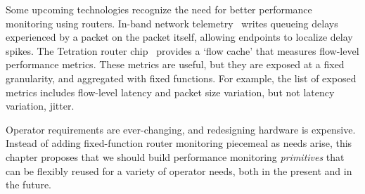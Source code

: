 Some upcoming technologies recognize the need for better performance monitoring
using routers. In-band network telemetry~\cite{int} writes queueing delays
experienced by a packet on the packet itself, allowing endpoints to localize
delay spikes. The Tetration router chip~\cite{tetration-telemetry} provides a
`flow cache' that measures flow-level performance metrics.
%
These metrics are useful, but they are exposed at a fixed granularity, and
aggregated with fixed functions. For example, the list of exposed metrics
includes flow-level latency and packet size variation, but not latency
variation, \ie jitter.

Operator requirements are ever-changing, and redesigning hardware is expensive.
Instead of adding fixed-function router monitoring piecemeal as needs arise,
this chapter proposes that we should build performance monitoring {\em
primitives} that can be flexibly reused for a variety of operator needs, both
in the present and in the future.


